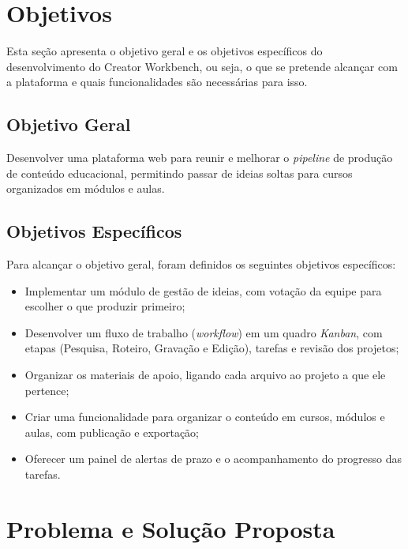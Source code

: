 \section{Objetivos}

Esta seção apresenta o objetivo geral e os objetivos específicos do desenvolvimento do Creator Workbench, ou seja, o que se pretende alcançar com a plataforma e quais funcionalidades são necessárias para isso.

\subsection{Objetivo Geral}

Desenvolver uma plataforma web para reunir e melhorar o \textit{pipeline} de produção de conteúdo educacional, permitindo passar de ideias soltas para cursos organizados em módulos e aulas.

\subsection{Objetivos Específicos}

Para alcançar o objetivo geral, foram definidos os seguintes objetivos específicos:

\begin{itemize}
    \item Implementar um módulo de gestão de ideias, com votação da equipe para escolher o que produzir primeiro;

    \item Desenvolver um fluxo de trabalho (\textit{workflow}) em um quadro \textit{Kanban}, com etapas (Pesquisa, Roteiro, Gravação e Edição), tarefas e revisão dos projetos;

    \item Organizar os materiais de apoio, ligando cada arquivo ao projeto a que ele pertence;

    \item Criar uma funcionalidade para organizar o conteúdo em cursos, módulos e aulas, com publicação e exportação;

    \item Oferecer um painel de alertas de prazo e o acompanhamento do progresso das tarefas.
\end{itemize}

\section{Problema e Solução Proposta}

